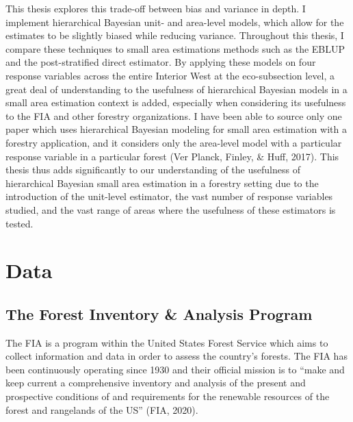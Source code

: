 \documentclass[12pt,twoside]{reedthesis}
\begin{document}
This thesis explores this trade-off between bias and variance in depth. I implement hierarchical Bayesian unit- and area-level models, which allow for the estimates to be slightly biased while reducing variance. Throughout this thesis, I compare these techniques to small area estimations methods such as the EBLUP and the post-stratified direct estimator. By applying these models on four response variables across the entire Interior West at the eco-subsection level, a great deal of understanding to the usefulness of hierarchical Bayesian models in a small area estimation context is added, especially when considering its usefulness to the FIA and other forestry organizations. I have been able to source only one paper which uses hierarchical Bayesian modeling for small area estimation with a forestry application, and it considers only the area-level model with a particular response variable in a particular forest (Ver Planck, Finley, \& Huff, 2017). This thesis thus adds significantly to our understanding of the usefulness of hierarchical Bayesian small area estimation in a forestry setting due to the introduction of the unit-level estimator, the vast number of response variables studied, and the vast range of areas where the usefulness of these estimators is tested.

\hypertarget{data}{%
\chapter{Data}\label{data}}

\hypertarget{the-forest-inventory-analysis-program}{%
\section{The Forest Inventory \& Analysis Program}\label{the-forest-inventory-analysis-program}}

The FIA is a program within the United States Forest Service which aims to collect information and data in order to assess the country's forests. The FIA has been continuously operating since 1930 and their official mission is to ``make and keep current a comprehensive inventory and analysis of the present and prospective conditions of and requirements for the renewable resources of the forest and rangelands of the US'' (FIA, 2020).
\end{document}
